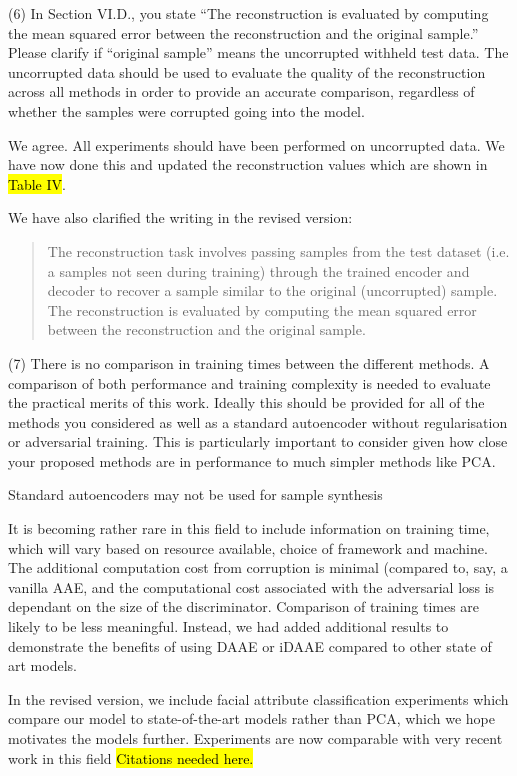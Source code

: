 \documentclass{article}
\begin{document}
{\color{blue}
(6) In Section VI.D., you state ``The reconstruction is evaluated by computing the mean squared error between the reconstruction and the original sample.'' Please clarify if ``original sample'' means the uncorrupted withheld test data. The uncorrupted data should be used to evaluate the quality of the reconstruction across all methods in order to provide an accurate comparison, regardless of whether the samples were corrupted going into the model.}\newline


We agree. All experiments should have been performed on uncorrupted data. We have now done this and updated the reconstruction values which are shown in \hl{Table IV}.
 
We have also clarified the writing in the revised version:
\begin{quote}
The reconstruction task involves passing samples from the test dataset (i.e. a samples not seen during training) through the trained encoder and decoder to recover a sample similar to the original (uncorrupted) sample. The reconstruction is evaluated by computing the mean squared error between the reconstruction and the original sample.
\end{quote}


{\color{blue}
(7) There is no comparison in training times between the different methods. A comparison of both performance and training complexity is needed to evaluate the practical merits of this work. Ideally this should be provided for all of the methods you considered as well as a standard autoencoder without regularisation or adversarial training. This is particularly important to consider given how close your proposed methods are in performance to much simpler methods like PCA.}\newline

Standard autoencoders may not be used for sample synthesis

 It is becoming rather rare in this field to include information on training time, which will vary based on resource available, choice of framework and machine. The additional computation cost from corruption is minimal (compared to, say, a vanilla AAE, and the computational cost associated with the adversarial loss is dependant on the size of the discriminator. Comparison of training times are likely to be less meaningful. Instead, we had added additional results to demonstrate the benefits of using DAAE or iDAAE compared to other state of art models.

In the revised version, we include facial attribute classification experiments which compare our model to state-of-the-art models rather than PCA, which we hope motivates the models further. Experiments are now comparable with very recent work in this field \hl{Citations needed here.}
\end{document}
